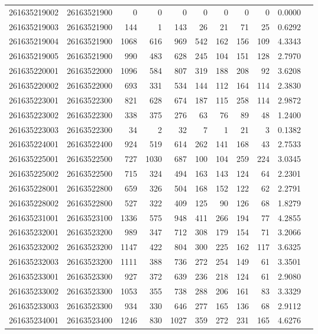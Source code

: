 \documentclass[11pt,landscape]{article}
\begin{document}
{\begin{longtable}[]{@{}lrrrrrrrrrr@{}}
261635219002 & 26163521900 & 0 & 0 & 0 & 0 & 0 & 0 & 0 & 0.0000 \\
261635219003 & 26163521900 & 144 & 1 & 143 & 26 & 21 & 71 & 25 & 0.6292 \\
261635219004 & 26163521900 & 1068 & 616 & 969 & 542 & 162 & 156 & 109 & 4.3343 \\
261635219005 & 26163521900 & 990 & 483 & 628 & 245 & 104 & 151 & 128 & 2.7970 \\
261635220001 & 26163522000 & 1096 & 584 & 807 & 319 & 188 & 208 & 92 & 3.6208 \\
261635220002 & 26163522000 & 693 & 331 & 534 & 144 & 112 & 164 & 114 & 2.3830 \\
261635223001 & 26163522300 & 821 & 628 & 674 & 187 & 115 & 258 & 114 & 2.9872 \\
261635223002 & 26163522300 & 338 & 375 & 276 & 63 & 76 & 89 & 48 & 1.2400 \\
261635223003 & 26163522300 & 34 & 2 & 32 & 7 & 1 & 21 & 3 & 0.1382 \\
261635224001 & 26163522400 & 924 & 519 & 614 & 262 & 141 & 168 & 43 & 2.7533 \\
261635225001 & 26163522500 & 727 & 1030 & 687 & 100 & 104 & 259 & 224 & 3.0345 \\
261635225002 & 26163522500 & 715 & 324 & 494 & 163 & 143 & 124 & 64 & 2.2301 \\
261635228001 & 26163522800 & 659 & 326 & 504 & 168 & 152 & 122 & 62 & 2.2791 \\
261635228002 & 26163522800 & 527 & 322 & 409 & 125 & 90 & 126 & 68 & 1.8279 \\
261635231001 & 26163523100 & 1336 & 575 & 948 & 411 & 266 & 194 & 77 & 4.2855 \\
261635232001 & 26163523200 & 989 & 347 & 712 & 308 & 179 & 154 & 71 & 3.2066 \\
261635232002 & 26163523200 & 1147 & 422 & 804 & 300 & 225 & 162 & 117 & 3.6325 \\
261635232003 & 26163523200 & 1111 & 388 & 736 & 272 & 254 & 149 & 61 & 3.3501 \\
261635233001 & 26163523300 & 927 & 372 & 639 & 236 & 218 & 124 & 61 & 2.9080 \\
261635233002 & 26163523300 & 1053 & 355 & 738 & 288 & 206 & 161 & 83 & 3.3329 \\
261635233003 & 26163523300 & 934 & 330 & 646 & 277 & 165 & 136 & 68 & 2.9112 \\
261635234001 & 26163523400 & 1246 & 830 & 1027 & 359 & 272 & 231 & 165 & 4.6276 \\

\end{longtable}}
\end{document}
